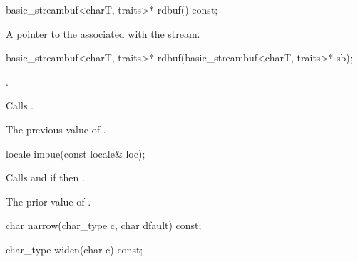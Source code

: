 %
\begin{itemdecl}
basic_streambuf<charT, traits>* rdbuf() const;
\end{itemdecl}

\begin{itemdescr}
\pnum
\returns
A pointer to the
associated with the stream.
\end{itemdescr}

%
\begin{itemdecl}
basic_streambuf<charT, traits>* rdbuf(basic_streambuf<charT, traits>* sb);
\end{itemdecl}

\begin{itemdescr}
\pnum
\ensures
{}.

\pnum
\effects
Calls
.

\pnum
\returns
The previous value of
.
\end{itemdescr}

%
\begin{itemdecl}
locale imbue(const locale& loc);
\end{itemdecl}

\begin{itemdescr}
\pnum
\effects
Calls
and
if
then
.

\pnum
\returns
The prior value of
.
\end{itemdescr}

%
\begin{itemdecl}
char narrow(char_type c, char dfault) const;
\end{itemdecl}

\begin{itemdescr}
\pnum
\returns
{}
\end{itemdescr}

%
\begin{itemdecl}
char_type widen(char c) const;
\end{itemdecl}

\begin{itemdescr}
\pnum
\returns
{}
\end{itemdescr}


